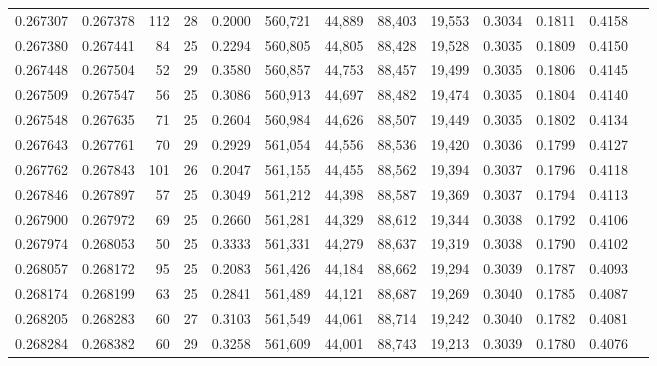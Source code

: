 \begin{tabular}{rrrrrrrrrrrrr}
0.267307 & 0.267378 & 112 &  28 &                                     0.2000 & 560,721 &  44,889 &  88,403 &  19,553 & 0.3034 & 0.1811 & 0.4158 \\
0.267380 & 0.267441 &  84 &  25 &                                     0.2294 & 560,805 &  44,805 &  88,428 &  19,528 & 0.3035 & 0.1809 & 0.4150 \\
0.267448 & 0.267504 &  52 &  29 &                                     0.3580 & 560,857 &  44,753 &  88,457 &  19,499 & 0.3035 & 0.1806 & 0.4145 \\
0.267509 & 0.267547 &  56 &  25 &                                     0.3086 & 560,913 &  44,697 &  88,482 &  19,474 & 0.3035 & 0.1804 & 0.4140 \\
0.267548 & 0.267635 &  71 &  25 &                                     0.2604 & 560,984 &  44,626 &  88,507 &  19,449 & 0.3035 & 0.1802 & 0.4134 \\
0.267643 & 0.267761 &  70 &  29 &                                     0.2929 & 561,054 &  44,556 &  88,536 &  19,420 & 0.3036 & 0.1799 & 0.4127 \\
0.267762 & 0.267843 & 101 &  26 &                                     0.2047 & 561,155 &  44,455 &  88,562 &  19,394 & 0.3037 & 0.1796 & 0.4118 \\
0.267846 & 0.267897 &  57 &  25 &                                     0.3049 & 561,212 &  44,398 &  88,587 &  19,369 & 0.3037 & 0.1794 & 0.4113 \\
0.267900 & 0.267972 &  69 &  25 &                                     0.2660 & 561,281 &  44,329 &  88,612 &  19,344 & 0.3038 & 0.1792 & 0.4106 \\
0.267974 & 0.268053 &  50 &  25 &                                     0.3333 & 561,331 &  44,279 &  88,637 &  19,319 & 0.3038 & 0.1790 & 0.4102 \\
0.268057 & 0.268172 &  95 &  25 &                                     0.2083 & 561,426 &  44,184 &  88,662 &  19,294 & 0.3039 & 0.1787 & 0.4093 \\
0.268174 & 0.268199 &  63 &  25 &                                     0.2841 & 561,489 &  44,121 &  88,687 &  19,269 & 0.3040 & 0.1785 & 0.4087 \\
0.268205 & 0.268283 &  60 &  27 &                                     0.3103 & 561,549 &  44,061 &  88,714 &  19,242 & 0.3040 & 0.1782 & 0.4081 \\
0.268284 & 0.268382 &  60 &  29 &                                     0.3258 & 561,609 &  44,001 &  88,743 &  19,213 & 0.3039 & 0.1780 & 0.4076 \\

\end{tabular}

